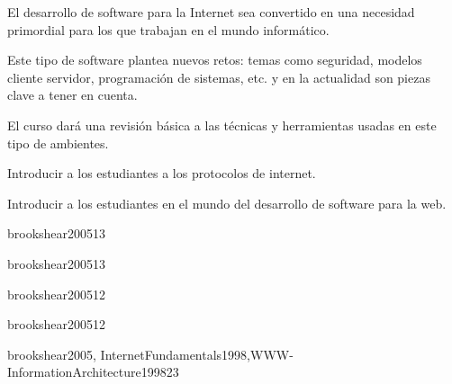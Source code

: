 \begin{syllabus}


\begin{justification}
El desarrollo de software para la Internet sea convertido en una necesidad primordial para los que trabajan en el mundo informático.

Este tipo de software plantea nuevos retos: temas como seguridad, modelos cliente servidor, programación de sistemas, etc. y en la actualidad son piezas clave a tener en cuenta.

El curso dará una revisión básica a las técnicas y herramientas usadas en este tipo de ambientes.
\end{justification}

\begin{goals}
\item Introducir a los estudiantes a los protocolos de internet.
\item Introducir a los estudiantes en el mundo del desarrollo de software para la web.
\end{goals}


\begin{unit}{\NCIntroduction}{}{brookshear2005}{1}{3}
   \NCIntroductionAllTopics
   \NCIntroductionAllLearningOutcomes
\end{unit}

\begin{unit}{\NCNetworkedApplications}{}{brookshear2005}{1}{3}
   \NCNetworkedApplicationsAllTopics
   \NCNetworkedApplicationsAllLearningOutcomes
\end{unit}

\begin{unit}{\OSSecurityandProtection}{}{brookshear2005}{1}{2}
   \OSSecurityandProtectionAllTopics
   \OSSecurityandProtectionAllLearningOutcomes
\end{unit}

\begin{unit}{\IMInformationManagementConcepts}{}{brookshear2005}{1}{2}
   \IMInformationManagementConceptsAllTopics
   \IMInformationManagementConceptsAllLearningOutcomes
\end{unit}

\begin{unit}{\SEToolsandEnvironments}{}{brookshear2005, InternetFundamentals1998,WWW-InformationArchitecture1998}{2}{3}
   \SEToolsandEnvironmentsAllTopics
   \SEToolsandEnvironmentsAllLearningOutcomes
\end{unit}


\end{syllabus}

